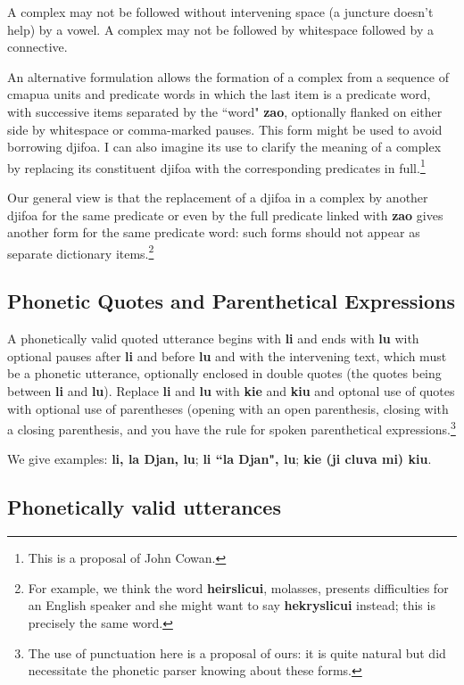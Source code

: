 \documentclass[12pt]{book}
\begin{document}
{A complex may not be followed without intervening space (a juncture doesn't help) by a vowel.  A complex may not be followed by whitespace followed by a connective.

An alternative formulation allows the formation of a complex from a sequence of cmapua units and predicate words in which the last item is a predicate word, with successive items 
separated by the ``word" {\bf zao}, optionally flanked on either side by whitespace or comma-marked pauses.  This form might be used to avoid borrowing djifoa.  I can also imagine its use to clarify the meaning of a complex by replacing its constituent djifoa with the corresponding predicates in full.\footnote{This is a proposal of John Cowan.}

Our general view is that the replacement of a djifoa in a complex by another djifoa for the same predicate or even by the full predicate linked with {\bf zao} gives another form for the same predicate word:  such forms should not appear as separate dictionary items.\footnote{For example, we think the word {\bf heirslicui}, molasses, presents difficulties for an English speaker and she might want to say {\bf hekryslicui} instead;  this is precisely the same word.}

\subsection{Phonetic Quotes and Parenthetical Expressions}

A phonetically valid quoted utterance begins with {\bf li} and ends with {\bf lu} with optional pauses after {\bf li} and before {\bf lu} and with the intervening text, which must be a phonetic utterance, optionally enclosed in double quotes (the quotes being between {\bf li} and {\bf lu}).  Replace {\bf li} and {\bf lu} with {\bf kie} and {\bf kiu} and optonal use of quotes with optional use of parentheses (opening with an open parenthesis, closing with a closing parenthesis, and you have the rule for spoken parenthetical expressions.\footnote{The use of punctuation here is a proposal of ours:  it is quite natural but did necessitate the phonetic parser knowing about these forms.}

We give examples:  {\bf li, la Djan, lu}; {\bf li ``la Djan", lu}; {\bf kie (ji cluva mi) kiu}.

\subsection{Phonetically valid utterances}

}
\end{document}
